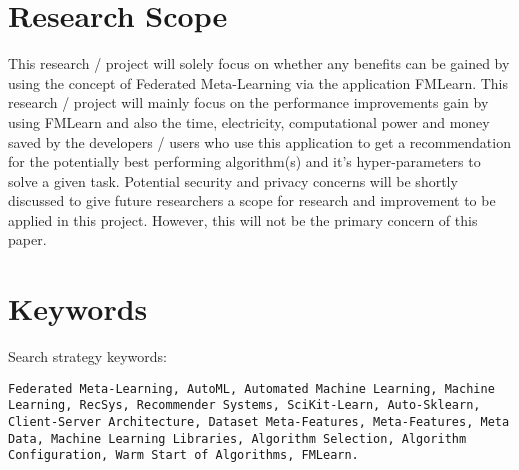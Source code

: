 
\section{Research Scope}
This research / project will solely focus on whether any benefits can be gained by using the concept of Federated Meta-Learning via the application FMLearn. This research / project will mainly focus on the performance improvements gain by using FMLearn and also the time, electricity, computational power and money saved by the developers / users who use this application to get a recommendation for the potentially best performing algorithm(s) and it's hyper-parameters to solve a given task. Potential security and privacy concerns will be shortly discussed to give future researchers a scope for research and improvement to be applied in this project. However, this will not be the primary concern of this paper.

\section{Keywords}
Search strategy keywords:

\texttt{Federated Meta-Learning, AutoML, Automated Machine Learning, Machine Learning, RecSys, Recommender Systems, SciKit-Learn, Auto-Sklearn, Client-Server Architecture, Dataset Meta-Features, Meta-Features, Meta Data, Machine Learning Libraries, Algorithm Selection, Algorithm Configuration, Warm Start of Algorithms, FMLearn.}

\fi